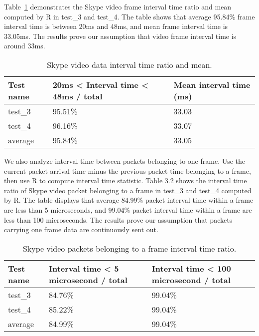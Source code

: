 \documentclass[master]{thesis}
\newcommand{\tref}[1]{Table~\ref{#1}}    %
\begin{document}
 \tref{table:t31} demonstrates the Skype video frame interval time ratio and mean computed by R in test\_3 and test\_4. The table shows that average 95.84\% frame interval time is between 20ms and 48ms, and mean frame interval time is 33.05ms. The results prove our assumption that video frame interval time is around 33ms. 

\begin{table}[hp]
    \caption[Skype video data interval time ratio and mean.]{Skype video data interval time ratio and mean.}
    \label{table:t31}

    \begin{center}
        \begin{tabular}{@{}*{3}{l}} %
            \toprule %
           Test name  & 20ms < Interval time < 48ms / total    & Mean interval time (ms)  \\
            \midrule %
	  test\_3	&95.51\%		&33.03	 \\
	  test\_4	&96.16\%		&33.07	 \\
	  average	&95.84\%		&33.05	 \\
            \bottomrule %
        \end{tabular}
    \end{center}
\end{table}

We also analyze interval time between packets belonging to one frame. Use the current packet arrival time minus the previous packet time belonging to a frame, then use R to compute interval time statistic. Table 3.2 shows the interval time ratio of Skype video packet belonging to a frame in test\_3 and test\_4 computed by R. The table displays that average 84.99\% packet interval time within a frame are less than 5 microseconds, and 99.04\% packet interval time within a frame are less than 100 microseconds. The results prove our assumption that packets carrying one frame data are continuously sent out. 

\begin{table}[hp]
    \caption[Skype video packets belonging to a frame interval time ratio.]{Skype video packets belonging to a frame interval time ratio.}
    \label{table:t32}
    \begin{center}
        \begin{tabular}{@{}*{3}{l}} %
            \toprule %
          Test name	&Interval time < 5 microsecond / total	&Interval time < 100 microsecond / total  \\
            \midrule %
		test\_3	&84.76\%	&99.04\%  \\
		test\_4	&85.22\%	&99.04\%  \\
		average	&84.99\%	&99.04\%  \\
            \bottomrule %
        \end{tabular}
    \end{center}
\end{table}
\end{document}
